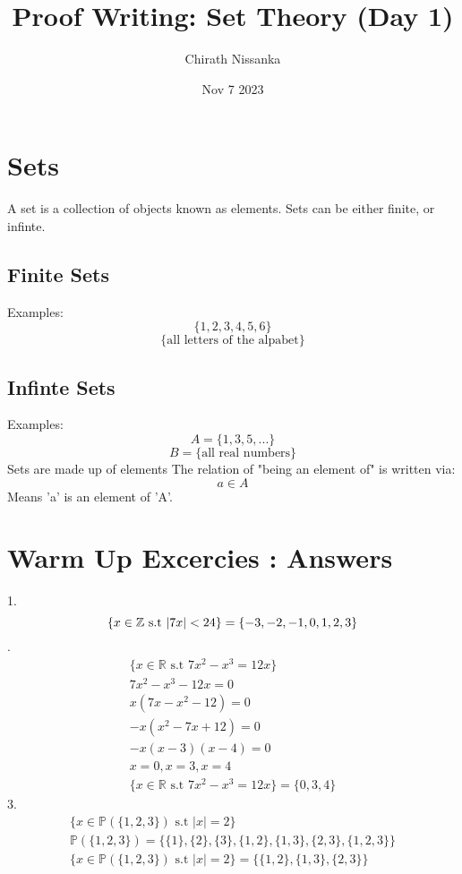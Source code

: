 \documentclass{article}
\author{Chirath Nissanka}
\title{Proof Writing: Set Theory (Day 1)}
\date{Nov 7 2023}
\begin{document}
    \maketitle
    \section{Sets}
    A set is a collection of objects known as elements.
    Sets can be either finite, or infinte.
    \subsection{Finite Sets}
    Examples:
    \[
        \{1,2,3,4,5,6\}   
    \]
    \[
        \{\text{all letters of the alpabet}\}   
    \]
    \subsection{Infinte Sets}
    Examples:
    \[
        A = \{1,3,5,...\}  
    \]
    \[
        B = \{\text{all real numbers}\}   
    \]
Sets are made up of elements 
The relation of "being an element of" is written via:
 \[ a \in A\]
 Means 'a' is an element of 'A'.
 
\section{Warm Up Excercies : Answers}
1.
\begin{dmath}
    \{ x \in \mathbb{Z} \text{ s.t } |7x| < 24 \} =  \\ 
    \{ -3, -2, -1, 0, 1, 2, 3 \} 
\end{dmath}
.
\[
    \begin{split}
        \{ x \in \mathbb{R} \text{ s.t }  7x^2 - x^3 = 12x \}  \\ 
        7x^2 - x^3 - 12x = 0 \\
        x  (7x - x^2 - 12) = 0 \\
        -x  (x^2 - 7x + 12) = 0 \\ 
        -x (x - 3) (x - 4) = 0 \\ 
        x = 0, x = 3, x = 4 \\
        \{ x \in \mathbb{R} \text{ s.t }  7x^2 - x^3 = 12x \}  = \{ 0, 3, 4\}
    \end{split}
\]
3. 
\[
    \begin{split}
        \{ x \in \mathbb{P}(\{1,2,3\}) \text{ s.t } |x| = 2 \}  \\
        \mathbb{P}(\{1,2,3\}) = \{\{1\}, \{2\}, \{3\}, \{1,2\}, \{1,3\}, \{2,3\}, \{1,2,3\}\}\\
        \{ x \in \mathbb{P}(\{1,2,3\}) \text{ s.t } |x| = 2 \}= \{\{1,2\},\{1,3\},\{2,3\}\}
    \end{split}
\]
\end{document}
